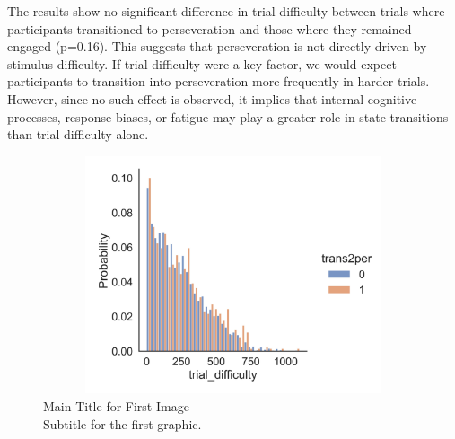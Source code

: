 The results show no significant difference in trial difficulty between trials where participants transitioned to perseveration and those where they remained engaged (p=0.16). This suggests that perseveration is not directly driven by stimulus difficulty. If trial difficulty were a key factor, we would expect participants to transition into perseveration more frequently in harder trials. However, since no such effect is observed, it implies that internal cognitive processes, response biases, or fatigue may play a greater role in state transitions than trial difficulty alone.
\begin{figure}[H]
    \centering
    \includegraphics[width=12cm,height=7cm]{MainLayout/Images/chapter9/trial_difficulty.jpg}
    \caption{Main Title for First Image \\ \small Subtitle for the first graphic.}
    \label{fig:trial_difficulty}
\end{figure}


